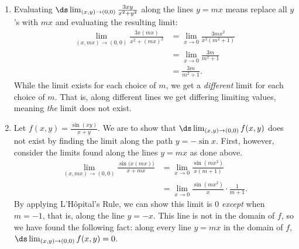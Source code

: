 
{\begin{enumerate}
	\item Evaluating $\ds \lim_{(x,y)\to (0,0)} \frac{3xy}{x^2+y^2}$ along the lines $y=mx$ means replace all $y$'s with $mx$ and evaluating the resulting limit:
	\begin{align*}
	\lim_{(x,mx)\to (0,0)} \frac{3x(mx)}{x^2+(mx)^2} &=\lim_{x\to 0} \frac{3mx^2}{x^2(m^2+1)}\\
				&= \lim_{x\to 0} \frac{3m}{m^2+1}\\
				&= \frac{3m}{m^2+1}.
	\end{align*}
	While the limit exists for each choice of $m$, we get a \emph{different} limit for each choice of $m$. That is, along different lines we get differing limiting values, meaning \emph{the} limit does not exist.
	
	\item		Let $f(x,y) = \frac{\sin(xy)}{x+y}$. We are to show that $\ds \lim_{(x,y)\to (0,0)} f(x,y)$ does not exist by finding the limit along the path $y=-\sin x$. First, however, consider the limits found along the lines $y=mx$ as done above.
	\begin{align*}
	\lim_{(x,mx)\to (0,0)} \frac{\sin\big(x(mx)\big)}{x+mx} &= \lim_{x\to 0} \frac{\sin (mx^2)}{x(m+1)} \\
	&= \lim_{x\to 0} \frac{\sin(mx^2)}{x}\cdot\frac1{m+1}.
	\end{align*}
	By applying L'H\^opital's Rule, we can show this limit is 0 \emph{except} when $m=-1$, that is, along the line $y=-x$. This line is not in the domain of $f$, so we have found the following fact: along every line $y=mx$ in the domain of $f$, $\ds \lim_{(x,y)\to(0,0)} f(x,y)=0$. %
	

\end{enumerate}}
